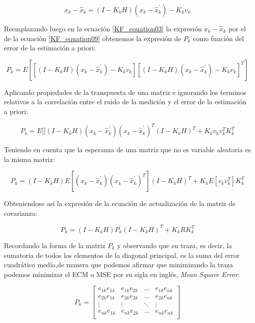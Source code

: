 \documentclass[10pt,a4paper]{article}
\begin{document}
\begin{equation}
    x_k - \hat{x}_k = (I-K_k H)(x_k - \hat{x}^\prime_k) - K_kv_{k}
    \label{KF_equation09}
\end{equation}	

Reemplazando luego en la ecuación \ref{KF_equation03} la expresión $x_k -
\hat{x}_k$  por el de la ecuación \ref{KF_equation09} obtenemos la expresión de
$P_k$ como función del error de la estimación a priori:

\begin{equation}
    P_k = E[[(I-K_k H)(x_k - \hat{x}^\prime_k) - K_kv_{k}][ (I-K_k H)(x_k - \hat{x}^\prime_k) - K_kv_{k}]^T]
    \label{KF_equation10}
\end{equation}	

\noindent Aplicando propiedades de la transpuesta de una matriz e ignorando 
los terminos relativos a la correlación entre el ruido de la medición y el 
error de la estimación a priori:

\begin{equation}
    P_k = E[[(I-K_k H)(x_k - \hat{x}^\prime_k)(x_k - \hat{x}^\prime_k)^T(I-K_k H)^T + K_k v_{k} v_{k}^T K_k^T 
    \label{KF_equation11}
\end{equation}	

Teniendo en cuenta que la esperanza de una matriz que no es variable aleatoria
es la misma matriz:

\begin{equation}
    P_k = (I-K_k H) E[(x_k - \hat{x}^\prime_k)(x_k - \hat{x}^\prime_k)^T](I-K_k H)^T + K_k E[v_{k} v_{k}^T] K_k^T 
    \label{KF_equation12}
\end{equation}	

\noindent Obteniendose así la expresión de la ecuación de actualización de 
la matriz de covarianza:

\begin{equation}
    P_k = (I-K_k H)P^\prime_k(I-K_k H)^T + K_k R K_k^T 
    \label{KF_equation13}
\end{equation}	

Recordando la forma de la matriz $P_k$ y observando que su traza, es decir, la
sumatoria de todos los elementos de la diagonal principal, es la suma del error
cuadrático medio,de manera que podemos afirmar que minimizando la traza podemos
minimizar el ECM o MSE por su sigla en inglés, \emph{Mean Square Error}.

\begin{equation}
    P_k = 
    \begin{bmatrix}
	e_{1k}e_{1k} & e_{1k}e_{2k} &	\dots  & e_{1k}e_{nk} \\
	e_{2k}e_{1k} & e_{2k}e_{2k} &	\dots  & e_{2k}e_{nk} \\
	\vdots       &   \vdots     &	\ddots & \vdots       \\
	e_{nk}e_{1k} & e_{nk}e_{2k} &	\dots  & e_{nk}e_{nk} \\
    \end{bmatrix}
\end{equation}
\end{document}
